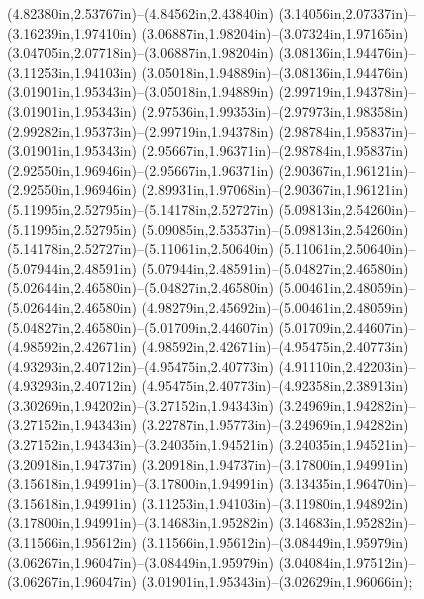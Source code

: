 (4.82380in,2.53767in)--(4.84562in,2.43840in) (3.14056in,2.07337in)--(3.16239in,1.97410in) (3.06887in,1.98204in)--(3.07324in,1.97165in) (3.04705in,2.07718in)--(3.06887in,1.98204in) (3.08136in,1.94476in)--(3.11253in,1.94103in) (3.05018in,1.94889in)--(3.08136in,1.94476in) (3.01901in,1.95343in)--(3.05018in,1.94889in) (2.99719in,1.94378in)--(3.01901in,1.95343in) (2.97536in,1.99353in)--(2.97973in,1.98358in) (2.99282in,1.95373in)--(2.99719in,1.94378in) (2.98784in,1.95837in)--(3.01901in,1.95343in) (2.95667in,1.96371in)--(2.98784in,1.95837in) (2.92550in,1.96946in)--(2.95667in,1.96371in) (2.90367in,1.96121in)--(2.92550in,1.96946in) (2.89931in,1.97068in)--(2.90367in,1.96121in) (5.11995in,2.52795in)--(5.14178in,2.52727in) (5.09813in,2.54260in)--(5.11995in,2.52795in) (5.09085in,2.53537in)--(5.09813in,2.54260in) (5.14178in,2.52727in)--(5.11061in,2.50640in) (5.11061in,2.50640in)--(5.07944in,2.48591in) (5.07944in,2.48591in)--(5.04827in,2.46580in) (5.02644in,2.46580in)--(5.04827in,2.46580in) (5.00461in,2.48059in)--(5.02644in,2.46580in) (4.98279in,2.45692in)--(5.00461in,2.48059in) (5.04827in,2.46580in)--(5.01709in,2.44607in) (5.01709in,2.44607in)--(4.98592in,2.42671in) (4.98592in,2.42671in)--(4.95475in,2.40773in) (4.93293in,2.40712in)--(4.95475in,2.40773in) (4.91110in,2.42203in)--(4.93293in,2.40712in) (4.95475in,2.40773in)--(4.92358in,2.38913in) (3.30269in,1.94202in)--(3.27152in,1.94343in) (3.24969in,1.94282in)--(3.27152in,1.94343in) (3.22787in,1.95773in)--(3.24969in,1.94282in) (3.27152in,1.94343in)--(3.24035in,1.94521in) (3.24035in,1.94521in)--(3.20918in,1.94737in) (3.20918in,1.94737in)--(3.17800in,1.94991in) (3.15618in,1.94991in)--(3.17800in,1.94991in) (3.13435in,1.96470in)--(3.15618in,1.94991in) (3.11253in,1.94103in)--(3.11980in,1.94892in) (3.17800in,1.94991in)--(3.14683in,1.95282in) (3.14683in,1.95282in)--(3.11566in,1.95612in) (3.11566in,1.95612in)--(3.08449in,1.95979in) (3.06267in,1.96047in)--(3.08449in,1.95979in) (3.04084in,1.97512in)--(3.06267in,1.96047in) (3.01901in,1.95343in)--(3.02629in,1.96066in);
